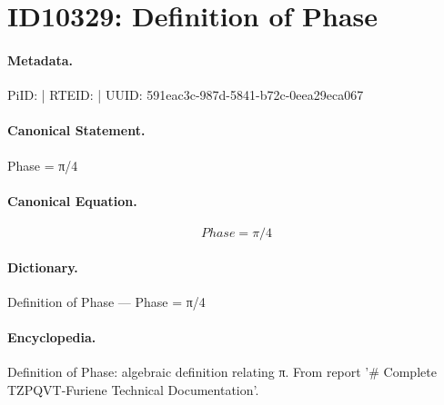 \section*{ID10329: Definition of Phase}
\paragraph{Metadata.}
PiID:  | RTEID:  | UUID: 591eac3c-987d-5841-b72c-0eea29eca067

\paragraph{Canonical Statement.}
Phase = π/4

\paragraph{Canonical Equation.}
\[
Phase = π/4
\]

\paragraph{Dictionary.}
Definition of Phase — Phase = π/4

\paragraph{Encyclopedia.}
Definition of Phase: algebraic definition relating π. From report '\# Complete TZPQVT-Furiene Technical Documentation'.
